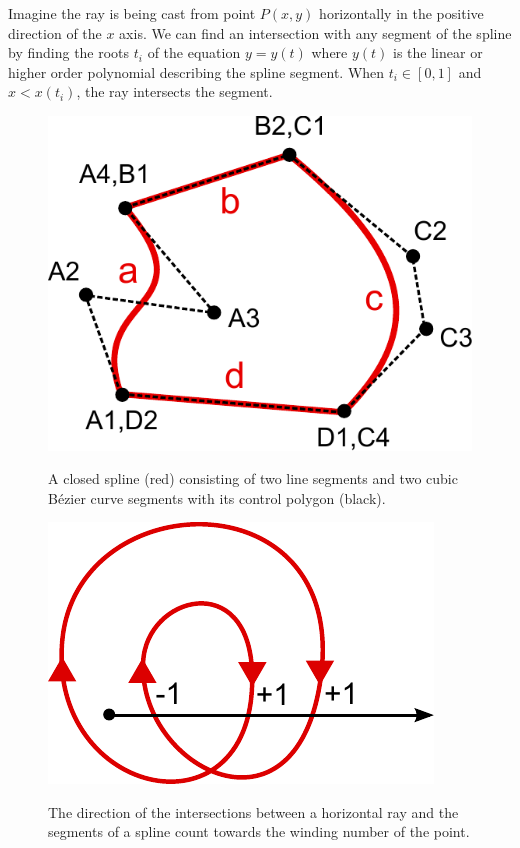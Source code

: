 \documentclass[11pt,a4paper,twoside]{article}
\begin{document}
Imagine the ray is being cast from point $P(x,y)$ horizontally in the positive direction of the $x$ axis. We can find an intersection with any segment of the spline by finding the roots $t_i$ of the equation $y = y(t)$ where $y(t)$ is the linear or higher order polynomial describing the spline segment. When $t_i \in [0,1]$ and $x < x(t_i)$, the ray intersects the segment.

\begin {figure}
\centering
\begin {minipage}[b]{0.45\linewidth}
	\centering
	\includegraphics [width=0.8\columnwidth]{figures/spline}
	\caption {A closed spline (red) consisting of two line segments and two cubic B\'{e}zier curve segments with its control polygon (black).}
	\label {fig:spline}
\end {minipage}
\hspace{0.5cm}
\begin {minipage}[b]{0.45\linewidth}
	\centering
	\includegraphics [width=0.8\columnwidth]{figures/ray}
	\caption {The direction of the intersections between a horizontal ray and the segments of a spline count towards the winding number of the point.}
	\label {fig:ray}
\end {minipage}
\end {figure}
\end{document}
